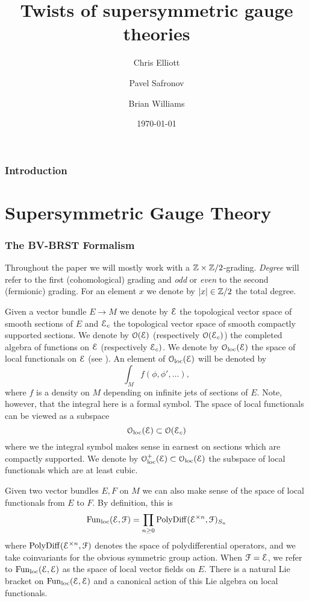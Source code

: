 \documentclass[10pt, oneside]{article}
\title{Twists of supersymmetric gauge theories}
\author{Chris Elliott\and Pavel Safronov \and Brian Williams}
\date{\today}
\begin{document}
\maketitle

\tableofcontents

\section*{Introduction}

\part{Supersymmetric Gauge Theory}

\section{The BV-BRST Formalism}

Throughout the paper we will mostly work with a $\mathbb Z\times\mathbb Z/2$-grading. \emph{Degree} will refer to the first (cohomological) grading and \emph{odd} or \emph{even} to the second (fermionic) grading. For an element $x$ we denote by $|x|\in\mathbb Z/2$ the total degree.

Given a vector bundle $E\rightarrow M$ we denote by $\mathcal E$ the topological vector space of smooth sections of $E$ and $\mathcal E_c$ the topological vector space of smooth compactly supported sections.
We denote by $\mathcal O(\mathcal E)$ (respectively $\mathcal O(\mathcal E_c)$) the completed algebra of functions on $\mathcal E$ (respectively $\mathcal E_c)$. 
We denote by $\mathcal{O}_{\rm loc}(\mathcal E)$ the space of local functionals on $\mathcal E$ (see \cite[Definition 4.5.1.1]{Book2}). An element of $\mathcal{O}_{\rm loc}(\mathcal E)$ will be denoted by
\[\int_M f (\phi, \phi', \dots),\]
where $f$ is a density on $M$ depending on infinite jets of sections of $E$. Note, however, that the integral here is a formal symbol. 
The space of local functionals can be viewed as a subspace
\[
\mathcal{O}_{\rm loc}(\mathcal E) \subset \mathcal O(\mathcal E_c)
\]
where we the integral symbol makes sense in earnest on sections which are compactly supported.
We denote by $\mathcal{O}_{\rm loc}^+(\mathcal E)\subset \mathcal{O}_{\rm loc}(\mathcal E)$ the subspace of local functionals which are at least cubic.

Given two vector bundles $E, F$ on $M$ we can also make sense of the space of local functionals from $E$ to $F$.
By definition, this is 
\[
{\rm Fun}_{\rm loc}(\mathcal E, \mathcal F) = \prod_{n \geq 0} {\rm PolyDiff}(\mathcal E^{\times n}, \mathcal F)_{S_n}
\]
where ${\rm PolyDiff}(\mathcal E^{\times n}, \mathcal F)$ denotes the space of polydifferential operators, and we take coinvariants for the obvious symmetric group action.
When $\mathcal F = \mathcal E$, we refer to ${\rm Fun}_{\rm loc}(\mathcal E, \mathcal E)$ as the space of local vector fields on $E$. 
There is a natural Lie bracket on ${\rm Fun}_{\rm loc}(\mathcal E, \mathcal E)$ and a canonical action of this Lie algebra on local functionals. 
\end{document}
